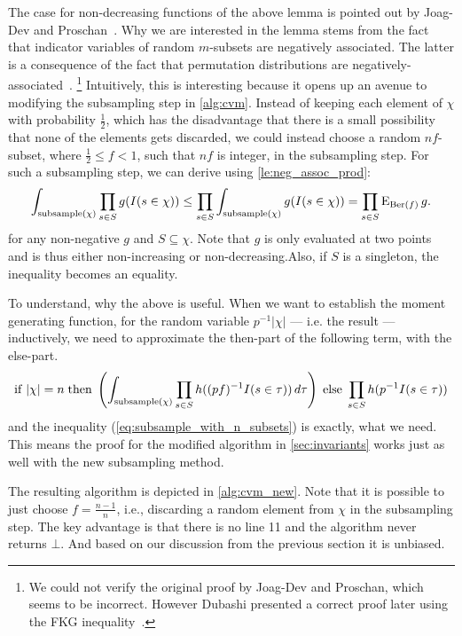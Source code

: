 The case for non-decreasing functions of the above lemma is pointed out by Joag-Dev and Proschan~\cite[P.2]{joagdev1983}.
Why we are interested in the lemma stems from the fact that indicator variables of random $m$-subsets are negatively associated.
The latter is a consequence of the fact that permutation distributions are negatively-associated~\cite[Th. 2.11]{joagdev1983}.%
\footnote{We could not verify the original proof by Joag-Dev and Proschan, which seems to be incorrect.
However Dubashi presented a correct proof later using the FKG inequality~\cite[Th. 10]{dubhashi1996}.}
Intuitively, this is interesting because it opens up an avenue to modifying the subsampling step in \cref{alg:cvm}.
Instead of keeping each element of $\chi$ with probability $\frac{1}{2}$, which has the disadvantage that there is a small possibility that none of the elements gets discarded, we could instead choose a random $nf$-subset, where $\frac{1}{2} \leq f < 1$, such that $nf$ is integer, in the subsampling step.
For such a subsampling step, we can derive using \cref{le:neg_assoc_prod}:
\begin{equation}\label{eq:subsample_with_n_subsets}
  \int_{\mathrm{subsample}(\chi)} \prod_{s \in S} g(I(s \in \chi)) \leq \prod_{s \in S} \int_{\mathrm{subsample}(\chi)} g(I(s \in \chi)) = \prod_{s \in S}  \operatorname{\mathrm{E}}_{\operatorname{\mathrm{Ber}}(f)} g \textrm{.}
\end{equation}
for any non-negative $g$ and $S \subseteq \chi$. Note that $g$ is only evaluated at two points and is thus either non-increasing or non-decreasing.Also, if $S$ is a singleton, the inequality becomes an equality.

To understand, why the above is useful.
When we want to establish the moment generating function, for the random variable $p^{-1} |\chi|$ --- i.e. the result --- inductively, we need to approximate the then-part of the following term, with the else-part.
\[
  \mathrm{if} \; |\chi|=n \; \mathrm{then} \; \left(\int_{\mathrm{subsample}(\chi)} \prod_{s \in S} h((pf)^{-1}I(s \in \tau)) \, d \tau\right) \; \mathrm{else} \; \prod_{s \in S} h(p^{-1}I(s \in \tau))
\]
and the inequality (\cref{eq:subsample_with_n_subsets}) is exactly, what we need.
This means the proof for the modified algorithm in \cref{sec:invariants} works just as well with the new subsampling method.

The resulting algorithm is depicted in \cref{alg:cvm_new}.
Note that it is possible to just choose $f = \frac{n-1}{n}$, i.e., discarding a random element from $\chi$ in the subsampling step.
The key advantage is that there is no line 11 and the algorithm never returns $\bot$.
And based on our discussion from the previous section it is unbiased.

